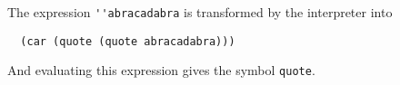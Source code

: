 \documentclass[a4paper,12pt]{article}
\begin{document}
The expression \lstinline!''abracadabra! is transformed by the
interpreter into
\begin{lstlisting}
  (car (quote (quote abracadabra)))
\end{lstlisting}
And evaluating this expression gives the symbol \lstinline!quote!.
\end{document}
